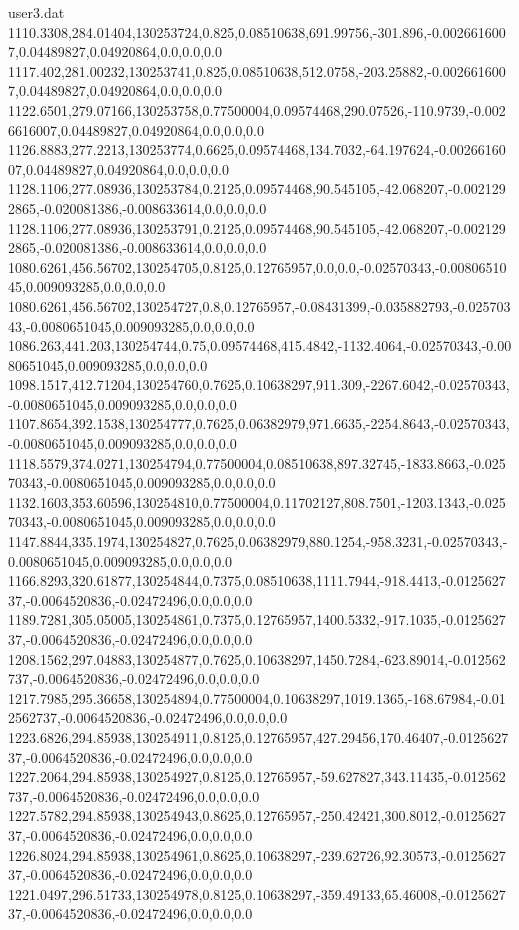 \begin{filecontents}{user3.dat}
1110.3308,284.01404,130253724,0.825,0.08510638,691.99756,-301.896,-0.0026616007,0.04489827,0.04920864,0.0,0.0,0.0
1117.402,281.00232,130253741,0.825,0.08510638,512.0758,-203.25882,-0.0026616007,0.04489827,0.04920864,0.0,0.0,0.0
1122.6501,279.07166,130253758,0.77500004,0.09574468,290.07526,-110.9739,-0.0026616007,0.04489827,0.04920864,0.0,0.0,0.0
1126.8883,277.2213,130253774,0.6625,0.09574468,134.7032,-64.197624,-0.0026616007,0.04489827,0.04920864,0.0,0.0,0.0
1128.1106,277.08936,130253784,0.2125,0.09574468,90.545105,-42.068207,-0.0021292865,-0.020081386,-0.008633614,0.0,0.0,0.0
1128.1106,277.08936,130253791,0.2125,0.09574468,90.545105,-42.068207,-0.0021292865,-0.020081386,-0.008633614,0.0,0.0,0.0
1080.6261,456.56702,130254705,0.8125,0.12765957,0.0,0.0,-0.02570343,-0.0080651045,0.009093285,0.0,0.0,0.0
1080.6261,456.56702,130254727,0.8,0.12765957,-0.08431399,-0.035882793,-0.02570343,-0.0080651045,0.009093285,0.0,0.0,0.0
1086.263,441.203,130254744,0.75,0.09574468,415.4842,-1132.4064,-0.02570343,-0.0080651045,0.009093285,0.0,0.0,0.0
1098.1517,412.71204,130254760,0.7625,0.10638297,911.309,-2267.6042,-0.02570343,-0.0080651045,0.009093285,0.0,0.0,0.0
1107.8654,392.1538,130254777,0.7625,0.06382979,971.6635,-2254.8643,-0.02570343,-0.0080651045,0.009093285,0.0,0.0,0.0
1118.5579,374.0271,130254794,0.77500004,0.08510638,897.32745,-1833.8663,-0.02570343,-0.0080651045,0.009093285,0.0,0.0,0.0
1132.1603,353.60596,130254810,0.77500004,0.11702127,808.7501,-1203.1343,-0.02570343,-0.0080651045,0.009093285,0.0,0.0,0.0
1147.8844,335.1974,130254827,0.7625,0.06382979,880.1254,-958.3231,-0.02570343,-0.0080651045,0.009093285,0.0,0.0,0.0
1166.8293,320.61877,130254844,0.7375,0.08510638,1111.7944,-918.4413,-0.012562737,-0.0064520836,-0.02472496,0.0,0.0,0.0
1189.7281,305.05005,130254861,0.7375,0.12765957,1400.5332,-917.1035,-0.012562737,-0.0064520836,-0.02472496,0.0,0.0,0.0
1208.1562,297.04883,130254877,0.7625,0.10638297,1450.7284,-623.89014,-0.012562737,-0.0064520836,-0.02472496,0.0,0.0,0.0
1217.7985,295.36658,130254894,0.77500004,0.10638297,1019.1365,-168.67984,-0.012562737,-0.0064520836,-0.02472496,0.0,0.0,0.0
1223.6826,294.85938,130254911,0.8125,0.12765957,427.29456,170.46407,-0.012562737,-0.0064520836,-0.02472496,0.0,0.0,0.0
1227.2064,294.85938,130254927,0.8125,0.12765957,-59.627827,343.11435,-0.012562737,-0.0064520836,-0.02472496,0.0,0.0,0.0
1227.5782,294.85938,130254943,0.8625,0.12765957,-250.42421,300.8012,-0.012562737,-0.0064520836,-0.02472496,0.0,0.0,0.0
1226.8024,294.85938,130254961,0.8625,0.10638297,-239.62726,92.30573,-0.012562737,-0.0064520836,-0.02472496,0.0,0.0,0.0
1221.0497,296.51733,130254978,0.8125,0.10638297,-359.49133,65.46008,-0.012562737,-0.0064520836,-0.02472496,0.0,0.0,0.0

\end{filecontents}
